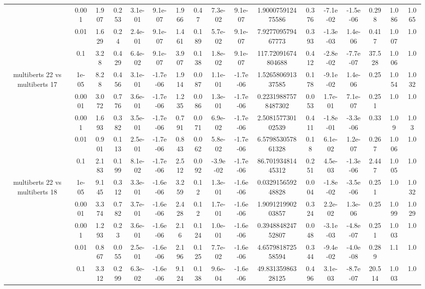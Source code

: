 \begin{tabular}{|c|c|c|c|c|c|c|c|c|c|c|c|c|c|c|c|c|}
 & 0.001 & 1.907 & 0.253 & 3.1e-01 & 9.1e-07 & 1.966 & 0.47 & 7.3e-02 & 9.1e-07 & 1.900075912475586 & 0.376 & -7.1e-02 & -1.5e-06 & 0.298 & 1.086 & 1.065 \\
 & 0.01 & 1.629 & 0.24 & 2.4e-01 & 9.1e-07 & 1.461 & 0.189 & 5.7e-02 & 9.1e-07 & 7.927709579467773 & 0.393 & -1.3e-03 & 1.4e-06 & 0.417 & 1.007 & 1.0 \\
 & 0.1 & 3.28 & 0.429 & 6.4e-02 & 9.1e-07 & 3.907 & 0.138 & 1.8e-02 & 9.1e-07 & 117.72091674804688 & 0.412 & -2.8e-02 & -7.7e-07 & 37.528 & 1.006 & 1.0 \\
\hline
\multirow{5}{*}{multiberts 22 vs multiberts 17} & 1e-05 & 8.28 & 0.456 & 3.1e-01 & -1.7e-06 & 1.914 & 0.087 & 1.1e-01 & -1.7e-06 & 1.526580691337585 & 0.178 & -9.1e-02 & 1.4e-06 & 0.25 & 1.054 & 1.032 \\
 & 0.0001 & 3.072 & 0.776 & 3.6e-01 & -1.7e-06 & 1.235 & 0.086 & 1.3e-01 & -1.7e-06 & 0.22319887578487302 & 0.053 & 1.7e-01 & 7.1e-07 & 0.251 & 1.0 & 1.0 \\
 & 0.001 & 1.693 & 0.382 & 3.5e-01 & -1.7e-06 & 0.791 & 0.071 & 6.9e-02 & -1.7e-06 & 2.508157730102539 & 0.411 & -1.8e-01 & -3.3e-06 & 0.33 & 1.09 & 1.03 \\
 & 0.01 & 0.901 & 0.113 & 2.5e-01 & -1.7e-06 & 0.843 & 0.062 & 5.8e-02 & -1.7e-06 & 6.579853057861328 & 0.18 & 6.1e-02 & 1.2e-07 & 0.267 & 1.006 & 1.0 \\
 & 0.1 & 2.183 & 0.199 & 8.1e-02 & -1.7e-06 & 2.512 & 0.092 & -3.9e-02 & -1.7e-06 & 86.70193481445312 & 0.251 & 4.5e-03 & -1.3e-06 & 2.447 & 1.005 & 1.0 \\
\hline
\multirow{5}{*}{multiberts 22 vs multiberts 18} & 1e-05 & 9.145 & 0.312 & 3.3e-01 & -1.6e-06 & 3.259 & 0.12 & 1.3e-01 & -1.6e-06 & 0.032915659248828 & 0.004 & -1.8e-02 & -3.5e-06 & 0.251 & 1.0 & 1.032 \\
 & 0.0001 & 3.374 & 0.782 & 3.7e-01 & -1.6e-06 & 2.428 & 0.12 & 1.7e-01 & -1.6e-06 & 1.909121990203857 & 0.324 & 2.2e-02 & 1.3e-06 & 0.25 & 1.099 & 1.029 \\
 & 0.001 & 1.293 & 0.23 & 3.6e-01 & -1.6e-06 & 2.16 & 0.124 & 1.0e-01 & -1.6e-06 & 0.394884824752807 & 0.048 & -3.1e-03 & -4.8e-07 & 0.251 & 1.003 & 1.0 \\
 & 0.01 & 0.867 & 0.055 & 2.5e-01 & -1.6e-06 & 2.196 & 0.125 & 7.7e-02 & -1.6e-06 & 4.657981872558594 & 0.344 & -9.4e-02 & -4.0e-08 & 0.289 & 1.1 & 1.0 \\
 & 0.1 & 3.312 & 0.299 & 6.3e-02 & -1.6e-06 & 9.124 & 0.138 & 9.6e-04 & -1.6e-06 & 49.83135986328125 & 0.496 & 3.1e-03 & -8.7e-07 & 20.514 & 1.003 & 1.0 \\

\end{tabular}
